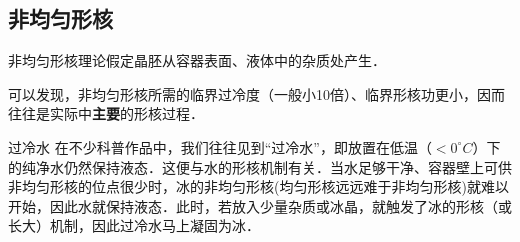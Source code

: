 \subsection{非均匀形核}
非均匀形核理论假定晶胚从容器表面、液体中的杂质处产生．

可以发现，非均匀形核所需的临界过冷度（一般小10倍）、临界形核功更小，因而往往是实际中\textbf{主要}的形核过程．

\begin{example}{过冷水}
在不少科普作品中，我们往往见到“过冷水”，即放置在低温（$<0 ^\circ C$）下的纯净水仍然保持液态．这便与水的形核机制有关．当水足够干净、容器壁上可供非均匀形核的位点很少时，冰的非均匀形核(均匀形核远远难于非均匀形核)就难以开始，因此水就保持液态．此时，若放入少量杂质或冰晶，就触发了冰的形核（或长大）机制，因此过冷水马上凝固为冰．
\end{example}
